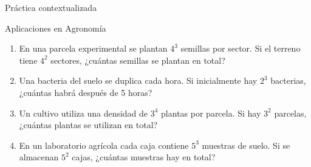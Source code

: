 \documentclass[aspectratio=169,10pt,handout]{beamer}
\begin{document}
	\begin{frame}{Práctica contextualizada}
		
		\begin{block}{Aplicaciones en Agronomía}
			
			\begin{enumerate}
				
				\item En una parcela experimental se plantan \(4^3\) semillas por sector.  
				Si el terreno tiene \(4^2\) sectores, ¿cuántas semillas se plantan en total?
				
				\pause
				
				\item Una bacteria del suelo se duplica cada hora.  
				Si inicialmente hay \(2^3\) bacterias, ¿cuántas habrá después de 5 horas?
				
				\pause
				
				\item Un cultivo utiliza una densidad de \(3^4\) plantas por parcela.  
				Si hay \(3^2\) parcelas, ¿cuántas plantas se utilizan en total?
				
				\pause
				
				\item En un laboratorio agrícola cada caja contiene \(5^3\) muestras de suelo.  
				Si se almacenan \(5^2\) cajas, ¿cuántas muestras hay en total?
				
			\end{enumerate}
			
		\end{block}
		
	\end{frame}
	
\end{document}
